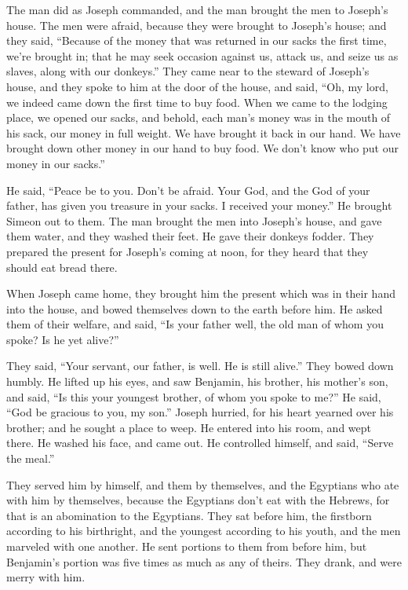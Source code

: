 \myverse{}The man did as Joseph commanded, and the man brought the men to Joseph’s house.  \myverse{}The men were afraid, because they were brought to Joseph’s house; and they said, “Because of the money that was returned in our sacks the first time, we’re brought in; that he may seek occasion against us, attack us, and seize us as slaves, along with our donkeys.”  \myverse{}They came near to the steward of Joseph’s house, and they spoke to him at the door of the house,  \myverse{}and said, “Oh, my lord, we indeed came down the first time to buy food.  \myverse{}When we came to the lodging place, we opened our sacks, and behold, each man’s money was in the mouth of his sack, our money in full weight. We have brought it back in our hand.  \myverse{}We have brought down other money in our hand to buy food. We don’t know who put our money in our sacks.”

\myverse{}He said, “Peace be to you. Don’t be afraid. Your God, and the God of your father, has given you treasure in your sacks. I received your money.” He brought Simeon out to them.  \myverse{}The man brought the men into Joseph’s house, and gave them water, and they washed their feet. He gave their donkeys fodder.  \myverse{}They prepared the present for Joseph’s coming at noon, for they heard that they should eat bread there.

\myverse{}When Joseph came home, they brought him the present which was in their hand into the house, and bowed themselves down to the earth before him.  \myverse{}He asked them of their welfare, and said, “Is your father well, the old man of whom you spoke? Is he yet alive?”

\myverse{}They said, “Your servant, our father, is well. He is still alive.” They bowed down humbly.  \myverse{}He lifted up his eyes, and saw Benjamin, his brother, his mother’s son, and said, “Is this your youngest brother, of whom you spoke to me?” He said, “God be gracious to you, my son.”  \myverse{}Joseph hurried, for his heart yearned over his brother; and he sought a place to weep. He entered into his room, and wept there.  \myverse{}He washed his face, and came out. He controlled himself, and said, “Serve the meal.”

\myverse{}They served him by himself, and them by themselves, and the Egyptians who ate with him by themselves, because the Egyptians don’t eat with the Hebrews, for that is an abomination to the Egyptians.  \myverse{}They sat before him, the firstborn according to his birthright, and the youngest according to his youth, and the men marveled with one another.  \myverse{}He sent portions to them from before him, but Benjamin’s portion was five times as much as any of theirs. They drank, and were merry with him.

